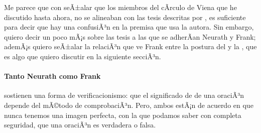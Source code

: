Me parece que con seÃ±alar que los miembros del cÃ­rculo de Viena que he discutido hasta ahora, no se alineaban con las tesis descritas por \parencite{Yturbe1995}, es suficiente para decir que hay una confusiÃ³n en la premisa que usa la autora.
Sin embargo, quiero decir un poco mÃ¡s sobre las tesis a las que se adherÃ­an Neurath y Frank; ademÃ¡s quiero seÃ±alar la relaciÃ³n que ve Frank entre la postura del  y la , que es algo que quiero discutir en la siguiente secciÃ³n.

\paragraph{Tanto Neurath como Frank} sostienen una forma de verificacionismo: que el significado de de una oraciÃ³n depende del mÃ©todo de comprobaciÃ³n.
Pero, ambos estÃ¡n de acuerdo en que nunca tenemos una imagen perfecta, con la que podamos saber con completa seguridad, que una oraciÃ³n es verdadera o falsa.






